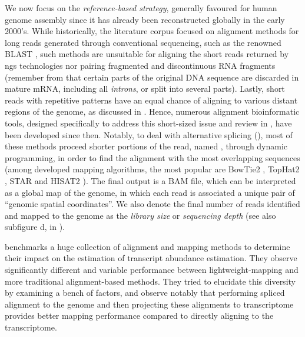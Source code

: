 \begin{enumerate}[label=(\roman*)]
    We now focus on the \emph{reference-based strategy}, generally favoured for human genome assembly since it has already been reconstructed globally in the early 2000's. While historically, the literature corpus focused on alignment methods for long reads generated through conventional sequencing, such as the renowned BLAST \autocite{altschul_etal90},  such methods are unsuitable for aligning the short reads returned by \acrshort{ngs} technologies nor pairing fragmented and discontinuous RNA fragments (remember from  that certain parts of the original DNA sequence are discarded in mature mRNA, including all \emph{introns}, or split into several parts). Lastly, short reads with repetitive patterns have an equal chance of aligning to various distant regions of the genome, as discussed in \autocite{treangen_salzberg12}.
     Hence, numerous alignment bioinformatic tools, designed specifically to address this short-sized issue and review in \autocite{treangen_salzberg12}, have been developed since then. Notably, to deal with alternative splicing (), most of these methods proceed shorter portions of the read, named , through dynamic programming, in order to find the alignment with the most overlapping sequences (among developed mapping algorithms, the most popular are BowTie2 \autocite{langmead_salzberg12}, TopHat2 \autocite{kim_etal13}, STAR \autocite{dobin_etal13} and HISAT2 \autocite{kim_etal19}). The final output is a BAM file, which can be interpreted as a global map of the genome, in which each read is associated a unique pair of \enquote{genomic spatial coordinates}. We also denote the final number of reads identified and mapped to the genome as the \emph{library size} or \emph{sequencing depth} (see also subfigure d, in ).  
     
     \autocite{srivastava_etal20} benchmarks a huge collection of alignment and mapping methods to determine their impact on the estimation of transcript abundance estimation. They observe significantly different and variable performance between lightweight-mapping and more traditional alignment-based methods. They tried to elucidate this diversity by examining a bench of factors, and observe notably that performing spliced alignment to the genome and then projecting these alignments to transcriptome provides better mapping performance compared to directly aligning to the transcriptome.
    

\end{enumerate}
